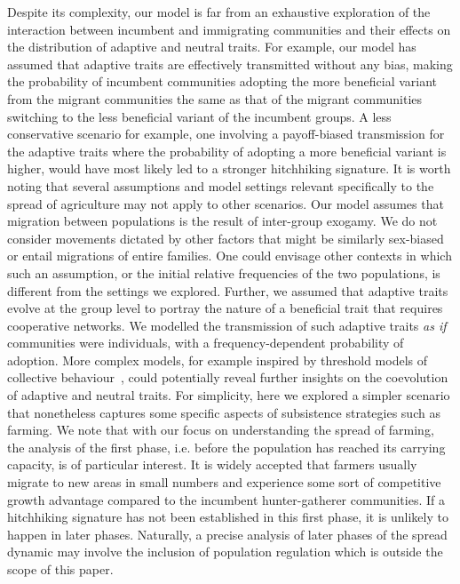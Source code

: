 \documentclass[9pt,twocolumn,twoside,lineno]{pnas-new}
\begin{document}
Despite its complexity, our model is far from an exhaustive exploration of the interaction between incumbent and immigrating communities and their effects on the distribution of adaptive and neutral traits. 
For example, our model has assumed that adaptive traits are effectively transmitted without any bias, making the probability of incumbent communities adopting the more beneficial variant from the migrant communities the same as that of the migrant communities switching to the less beneficial variant of the incumbent groups. 
A less conservative scenario for example, one involving a payoff-biased transmission for the adaptive traits where the probability of adopting a more beneficial variant is higher, would have most likely led to a stronger hitchhiking signature. 
It is worth noting that several assumptions and model settings relevant specifically to the spread of agriculture may not apply to other scenarios. 
Our model assumes that migration between populations is the result of inter-group exogamy. We do not consider movements dictated by other factors that might be similarly sex-biased or entail migrations of entire families.
One could envisage other contexts in which such an assumption, or the initial relative frequencies of the two populations, is different from the settings we explored.
Further, we assumed that adaptive traits evolve at the group level to portray the nature of a beneficial trait that requires cooperative networks. 
We modelled the transmission of such adaptive traits \textit{as if} communities were individuals, with a frequency-dependent probability of adoption. More complex models, for example inspired by threshold models of collective behaviour~\cite{granovetter_threshold_1978}, could potentially reveal further insights on the coevolution of adaptive and neutral traits. For simplicity, here we explored a simpler scenario that nonetheless captures some specific aspects of subsistence strategies such as farming. 
We note that with our focus on understanding the spread of farming, the analysis of the first phase, i.e. before the population has reached its carrying capacity, is of particular interest. It is widely accepted that farmers usually migrate to new areas in small numbers and experience some sort of competitive growth advantage compared to the incumbent hunter-gatherer communities. If a hitchhiking signature has not been established in this first phase, it is  unlikely to happen in later phases. Naturally, a precise analysis of later phases of the spread dynamic may involve the inclusion of population regulation which is outside the scope of this paper. 
\end{document}
